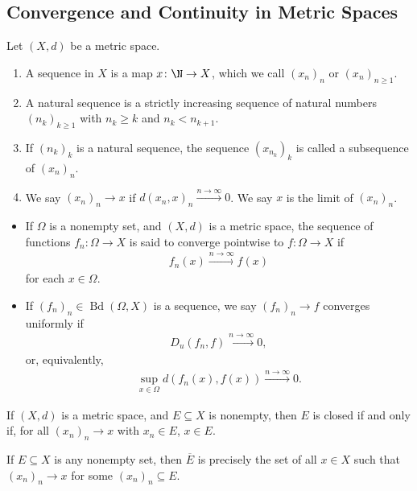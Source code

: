 \subsection{Convergence and Continuity in Metric Spaces}%
\begin{definition}
  Let $\left(X,d\right)$ be a metric space.
  \begin{enumerate}[(1)]
    \item A sequence in $X$ is a map $x\colon \N\rightarrow X$, which we call $\left(x_{n}\right)_{n}$ or $\left(x_{n}\right)_{n\geq 1}$.
    \item A natural sequence is a strictly increasing sequence of natural numbers $\left(n_{k}\right)_{k\geq 1}$ with $n_{k}\geq k$ and $n_{k} < n_{k+1}$.
    \item If $\left(n_k\right)_{k}$ is a natural sequence, the sequence $\left(x_{n_k}\right)_{k}$ is called a subsequence of $\left(x_{n}\right)_n$.
    \item We say $\left(x_n\right)_n\rightarrow x$ if $d\left(x_n,x\right)_{n} \xrightarrow{n\rightarrow\infty} 0$. We say $x$ is the limit of $\left(x_n\right)_n$.
  \end{enumerate}
\end{definition}
\begin{example}\hfill
  \begin{itemize}
    \item If $\Omega$ is a nonempty set, and $\left(X,d\right)$ is a metric space, the sequence of functions $f_n\colon \Omega\rightarrow X$ is said to converge pointwise to $f\colon \Omega\rightarrow X$ if
      \begin{align*}
        f_n\left(x\right)\xrightarrow{n\rightarrow\infty}f(x)
      \end{align*}
      for each $x\in \Omega$.
    \item If $\left(f_n\right)_n\in \operatorname{Bd}\left(\Omega,X\right)$ is a sequence, we say $\left(f_n\right)_n\rightarrow f$ converges uniformly if
      \begin{align*}
        D_u\left(f_n,f\right)\xrightarrow{n\rightarrow\infty}0,
      \end{align*}
      or, equivalently,
      \begin{align*}
        \sup_{x\in\Omega}d\left(f_n(x),f(x)\right)\xrightarrow{n\rightarrow\infty}0.
      \end{align*}
  \end{itemize}
\end{example}
\begin{definition}
  If $\left(X,d\right)$ is a metric space, and $E\subseteq X$ is nonempty, then $E$ is closed if and only if, for all $\left(x_n\right)_n\rightarrow x$ with $x_n\in E$, $x\in E$.\newline

  If $E\subseteq X$ is any nonempty set, then $\overline{E}$ is precisely the set of all $x\in X$ such that $\left(x_n\right)_n\rightarrow x$ for some $\left(x_n\right)_n\subseteq E$.
\end{definition}
